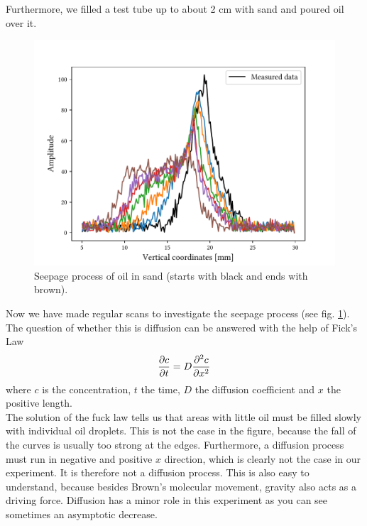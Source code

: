 Furthermore, we filled a test tube up to about 2 cm with sand and poured oil over it.
\begin{figure}[ht]
\centering
\includegraphics[scale=.6]{..//figures//f61_abb_9.pdf}
\caption{Seepage process of oil in sand (starts with black and ends with brown).}
\label{fig:sand}
\end{figure}
Now we have made regular scans to investigate the seepage process (see fig. \ref{fig:sand}).\\
The question of whether this is diffusion can be answered with the help of Fick's Law
\begin{align}
\pdv{c}{t}=D\pdv[2]{c}{x}
\end{align}
where $c$ is the concentration, $t$ the time, $D$ the diffusion coefficient and $x$ the positive length.\\
The solution of the fuck law tells us that areas with little oil must be filled slowly with individual oil droplets.
This is not the case in the figure, because the fall of the curves is usually too strong at the edges.
Furthermore, a diffusion process must run in negative and positive $x$ direction, which is clearly not the case in our experiment.
It is therefore not a diffusion process.
This is also easy to understand, because besides Brown's molecular movement, gravity also acts as a driving force.
Diffusion has a minor role in this experiment as you can see sometimes an asymptotic decrease.
